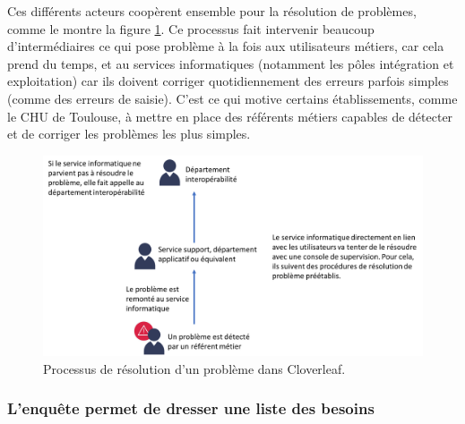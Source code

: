 			Ces différents acteurs coopèrent ensemble pour la résolution de problèmes,
			comme le montre la figure \ref{resolution_pbs}. Ce processus fait intervenir
			beaucoup d’intermédiaires ce qui pose problème à la fois aux utilisateurs métiers,
			car cela prend du temps, et au services informatiques
			(notamment les pôles intégration et exploitation) car ils doivent corriger
			quotidiennement des erreurs parfois simples (comme des erreurs de saisie).
			C'est ce qui motive certains établissements, comme le CHU de
			Toulouse, à mettre en place des référents métiers capables de détecter et
			de corriger les problèmes les plus simples.
			\begin{figure}[H]
				\centering
				\includegraphics[width=15cm]{../img/user_1.png}
				\caption{\label{resolution_pbs} Processus de résolution d'un problème dans
				Cloverleaf.}
			\end{figure}
			
		\subsubsection{L'enquête permet de dresser une liste des besoins}
